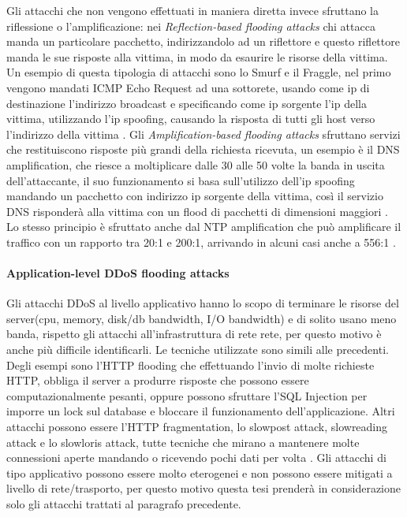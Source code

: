 Gli attacchi che non vengono effettuati in maniera diretta invece sfruttano la riflessione o l'amplificazione: nei \emph{Reflection-based flooding attacks} chi attacca manda un particolare pacchetto, indirizzandolo ad un riflettore e questo riflettore manda le sue risposte alla vittima, in modo da esaurire le risorse della vittima. Un esempio di questa tipologia di attacchi sono lo Smurf e il Fraggle, nel primo vengono mandati ICMP Echo Request ad una sottorete, usando come ip di destinazione l'indirizzo broadcast e specificando come ip sorgente l'ip della vittima, utilizzando l'ip spoofing, causando la risposta di tutti gli host verso l'indirizzo della vittima \cite{ddos_survey_2}.
Gli \emph{Amplification-based flooding attacks} sfruttano servizi che restituiscono risposte più grandi della richiesta ricevuta, un esempio è il DNS amplification, che riesce a moltiplicare dalle 30 alle 50 volte\cite{imperva_amplification} la banda in uscita dell'attaccante, il suo funzionamento si basa sull'utilizzo dell'ip spoofing mandando un pacchetto con indirizzo ip sorgente della vittima, così il servizio DNS risponderà alla vittima con un flood di pacchetti di dimensioni maggiori \cite{ddos_survey_1}. Lo stesso principio è sfruttato anche dal NTP amplification che può amplificare il traffico con un rapporto tra 20:1 e 200:1, arrivando in alcuni casi anche a 556:1 \cite{imperva_amplification}. 


\paragraph{Application-level DDoS flooding attacks} %
Gli attacchi DDoS al livello applicativo hanno lo scopo di terminare le risorse del server(cpu, memory, disk/db bandwidth, I/O bandwidth) e di solito usano meno banda, rispetto gli attacchi all'infrastruttura di rete rete, per questo motivo è anche più difficile identificarli. Le tecniche utilizzate sono simili alle precedenti. Degli esempi sono l'HTTP flooding che effettuando l'invio di molte richieste HTTP, obbliga il server a produrre risposte che possono essere computazionalmente pesanti, oppure possono sfruttare l'SQL Injection per imporre un lock sul database e bloccare il funzionamento dell'applicazione. Altri attacchi possono essere l'HTTP fragmentation, lo slowpost attack, slowreading attack e lo slowloris attack, tutte tecniche che mirano a mantenere molte connessioni aperte mandando o ricevendo pochi dati per volta \cite{ddos_survey_1}.
Gli attacchi di tipo applicativo possono essere molto eterogenei e non possono essere mitigati a livello di rete/trasporto, per questo motivo questa tesi prenderà in considerazione solo gli attacchi trattati al paragrafo precedente.


